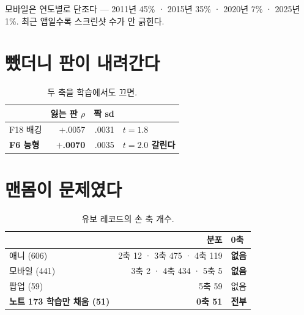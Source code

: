 \documentclass[10pt]{article}
\begin{document}
모바일은 연도별로 단조다 --- 2011년 45\% · 2015년 35\% · 2020년 7\% ·
2025년 1\%. 최근 앱일수록 스크린샷 수가 안 긁힌다.


\section{뺐더니 판이 내려간다}

\begin{table}[t]
\centering\tsize
\caption{두 축을 학습에서도 끄면.}
\begin{tabular}{lrrl}
\toprule
& 잃는 판 $\rho$ & 짝 sd & \\
\midrule
F18 배깅 & $+$.0057 & .0031 & $t{=}1.8$ \\
\textbf{F6 능형} & \textbf{$+$.0070} & .0035 & \textbf{$t{=}2.0$ 갈린다} \\
\bottomrule
\end{tabular}
\end{table}


\section{맨몸이 문제였다}

\begin{table}[t]
\centering\tsize
\caption{유보 레코드의 손 축 개수.}
\begin{tabular}{lrl}
\toprule
& 분포 & 0축 \\
\midrule
애니 (606) & 2축 12 · 3축 475 · 4축 119 & \textbf{없음} \\
모바일 (441) & 3축 2 · 4축 434 · 5축 5 & \textbf{없음} \\
팝업 (59) & 5축 59 & 없음 \\
\midrule
\textbf{노트 173 학습만 채움 (51)} & \textbf{0축 51} & \textbf{전부} \\
\bottomrule
\end{tabular}
\end{table}

\end{document}
